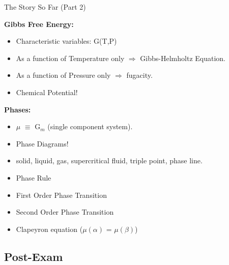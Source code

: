 \documentclass[t,10pt,mathserif,xcolor=pst,pdftex]{beamer}
\begin{document}
\begin{frame}{The Story So Far (Part 2)}

\textbf{Gibbs Free Energy:}
\begin{itemize}
\item Characteristic variables: G(T,P)
\item As a function of Temperature only $\Rightarrow$ Gibbs-Helmholtz Equation. 
\item As a function of Pressure only $\Rightarrow$ fugacity. 
\item Chemical Potential!
\end{itemize}

\textbf{Phases:}
\begin{itemize}
\item $\mu$ $\equiv$ G$_m$ (single component system). 
\item Phase Diagrams!
\item solid, liquid, gas, supercritical fluid, triple point, phase line. 
\item Phase Rule 
\item First Order Phase Transition
\item Second Order Phase Transition
\end{itemize}

\begin{itemize}
\item Clapeyron equation ($\mu(\alpha)$ = $\mu(\beta)$)
\end{itemize}


\end{frame}

\subsection{Post-Exam}
\end{document}
